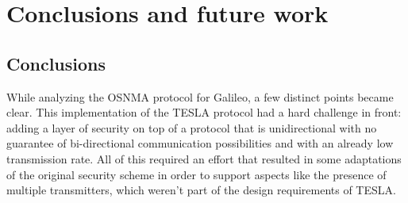 \chapter{Conclusions and future work}


\section{Conclusions}
While analyzing the OSNMA protocol for Galileo, a few distinct points became
clear. This implementation of the TESLA protocol had a hard challenge in front:
adding a layer of security on top of a protocol that is unidirectional with no
guarantee of bi-directional communication possibilities and with an already low
transmission rate. All of this required an effort that resulted in some
adaptations of the original security scheme in order to support aspects like the
presence of multiple transmitters, which weren't part of the design requirements
of TESLA.

